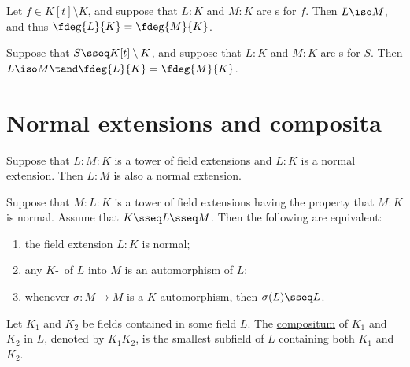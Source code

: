 \documentclass[a4paper]{article}
\begin{document}
\begin{ttheorem}
  Let \( f\in K[t]\setminus K \), and suppose that \( L:K \) and \( M:K \) are \sfe s for \( f \).
  Then \( L\iso M \), and thus \( \fdeg{L}{K}=\fdeg{M}{K} \).
\end{ttheorem}

\begin{ttheorem}
  Suppose that \( S\sseq K[t]\setminus K \), and suppose that \( L:K \) and \( M:K \) are \sfe s for \( S \).
  Then \( L\iso M\tand \fdeg{L}{K}=\fdeg{M}{K} \).
\end{ttheorem}

\section{Normal extensions and composita}

\begin{tproposition}
  Suppose that \( L:M:K \) is a tower of field extensions and \( L:K \) is a normal extension.
  Then \( L:M \) is also a normal extension.
\end{tproposition}

\begin{ttheorem}
  Suppose that \( M:L:K \) is a tower of field extensions having the property that \( M:K \) is normal.
  Assume that \( K\sseq L\sseq M \).
  Then the following are equivalent: \begin{enumerate}[label=(\roman*)]
    \item the field extension \( L:K \) is normal;
    \item any \( K \)-\homo~of \( L \) into \( M \) is an automorphism of \( L \);
    \item whenever \( \sigma:M\to M \) is a \( K \)-automorphism, then \( \sigma(L)\sseq L \).
  \end{enumerate}
\end{ttheorem}

\begin{tdefinition}[Compositum]
  Let \( K_1 \) and \( K_2 \) be fields contained in some field \( L \).
  The \ul{compositum} of \( K_1 \) and \( K_2 \) in \( L \), denoted by \( K_1K_2 \), is the smallest subfield of \( L \) containing both \( K_1 \) and \( K_2 \).
\end{tdefinition}
\end{document}
